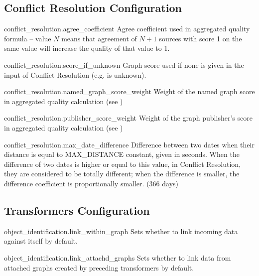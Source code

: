 \subsection*{Conflict Resolution Configuration}
\begin{configlist}
	\item[conflict\_resolution.agree\_coefficient]
		Agree coefficient used in aggregated quality formula -- value $N$ means that agreement of $N+1$ sources with score 1 on the same value will increase the quality of that value to 1.
	\item[conflict\_resolution.score\_if\_unknown]
			Graph score used if none is given in the input of Conflict Resolution (e.g. is unknown).
	\item[conflict\_resolution.named\_graph\_score\_weight]
			Weight of the named graph score in aggregated quality calculation (see \linebreak {})
	\item[conflict\_resolution.publisher\_score\_weight]
			Weight of the graph publisher's score in aggregated quality calculation (see \linebreak {})
	\item[conflict\_resolution.max\_date\_difference]
			Difference between two dates when their distance is equal to MAX\_DISTANCE constant, given in seconds. When the difference of two dates is higher or equal to this value, in Conflict Resolution, they are considered to be totally different; when the difference is smaller, the difference coefficient is proportionally smaller.
			 (366 days)
\end{configlist}

\subsection*{Transformers Configuration}
\begin{configlist}
	\item[object\_identification.link\_within\_graph]
		Sets whether to link incoming data against itself by default.
	\item[object\_identification.link\_attachd\_graphs]
		Sets whether to link data from attached graphs created by preceding transformers by default.
\end{configlist}


